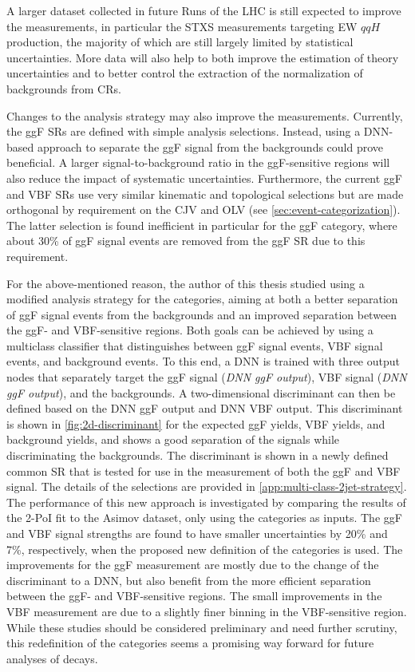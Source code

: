 A larger dataset collected in future Runs of the LHC is still expected to improve the measurements, in particular the STXS measurements targeting EW $qqH$ production, the majority of which are still largely limited by statistical uncertainties. 
More data will also help to both improve the estimation of theory uncertainties and to better control the extraction of the normalization of backgrounds from CRs. 

Changes to the analysis strategy may also improve the measurements. 
Currently, the ggF SRs are defined with simple analysis selections. Instead, using a DNN-based approach to separate the ggF signal from the backgrounds could prove beneficial. 
A larger signal-to-background ratio in the ggF-sensitive regions will also reduce the impact of systematic uncertainties. 
Furthermore, the current ggF and VBF \TwoJet SRs use very similar kinematic and topological selections but are made orthogonal by requirement on the CJV and OLV (see \cref{sec:event-categorization}). The latter selection is found inefficient in particular for the ggF \TwoJet category, where about 30\% of ggF signal events are removed from the ggF SR due to this requirement. 

For the above-mentioned reason, the author of this thesis studied using a modified analysis strategy for the \TwoJet categories, aiming at both a better separation of ggF signal events from the backgrounds and an improved separation between the ggF- and VBF-sensitive regions. 
Both goals can be achieved by using a multiclass classifier that distinguishes between ggF signal events, VBF signal events, and background events. 
To this end, a DNN is trained with three output nodes that separately target the ggF signal (\emph{DNN ggF output}), VBF signal (\emph{DNN ggF output}), and the backgrounds. 
A two-dimensional discriminant can then be defined based on the DNN ggF output and DNN VBF output.
This discriminant is shown in \cref{fig:2d-discriminant} for the expected ggF yields, VBF yields, and background yields, and shows a good separation of the signals while discriminating the backgrounds. 
The discriminant is shown in a newly defined common \TwoJet SR that is tested for use in the measurement of both the ggF and VBF signal. 
The details of the selections are provided in \cref{app:multi-class-2jet-strategy}. 
The performance of this new approach is investigated by comparing the results of the 2-PoI fit to the Asimov dataset, only using the \TwoJet categories as inputs. 
The ggF and VBF signal strengths are found to have smaller uncertainties by 20\% and 7\%, respectively, when the proposed new definition of the \TwoJet categories is used. 
The improvements for the ggF measurement are mostly due to the change of the discriminant to a DNN, but also benefit from the more efficient separation between the ggF- and VBF-sensitive regions. 
The small improvements in the VBF measurement are due to a slightly finer binning in the VBF-sensitive region. 
While these studies should be considered preliminary and need further scrutiny, this redefinition of the \TwoJet categories seems a promising way forward for future analyses of \HWW decays.

